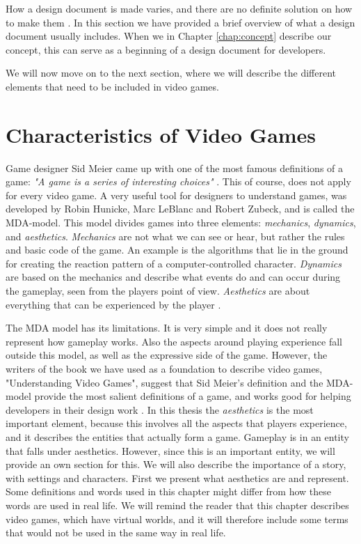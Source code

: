 How a design document is made varies, and there are no definite solution on how to make them \cite{gamedesign}. In this section we have provided a brief overview of what a design document usually includes. When we in Chapter \ref{chap:concept} describe our concept, this can serve as a beginning of a design document for developers.

We will now move on to the next section, where we will describe the different elements that need to be included in video games.

\section{Characteristics of Video Games}
\label{sec:videogametheory}

Game designer Sid Meier came up with one of the most famous definitions of a game: \emph{"A game is a series of interesting choices"} \cite{understandingvg}. This of course, does not apply for every video game. A very useful tool for designers to understand games, was developed by Robin Hunicke, Marc LeBlanc and Robert Zubeck, and is called the MDA-model. This model divides games into three elements: \emph{mechanics}, \emph{dynamics}, and \emph{aesthetics}. \emph{Mechanics} are not what we can see or hear, but rather the rules and basic code of the game. An example is the algorithms that lie in the ground for creating the reaction pattern of a computer-controlled character. \emph{Dynamics} are based on the mechanics and describe what events do and can occur during the gameplay, seen from the players point of view. \emph{Aesthetics} are about everything that can be experienced by the player \cite{understandingvg}. 

The MDA model has its limitations. It is very simple and it does not really represent how gameplay works. Also the aspects around playing experience fall outside this model, as well as the expressive side of the game. However, the writers of the book we have used as a foundation to describe video games, "Understanding Video Games", suggest that Sid Meier's definition and the MDA-model provide the most salient definitions of a game, and works good for helping developers in their design work \cite{understandingvg}. In this thesis the \emph{aesthetics} is the most important element, because this involves all the aspects that players experience, and it describes the entities that actually form a game. Gameplay is in \cite{understandingvg} an entity that falls under aesthetics. However, since this is an important entity, we will provide an own section for this. We will also describe the importance of a story, with settings and characters. First we present what aesthetics are and represent. Some definitions and words used in this chapter might differ from how these words are used in real life. We will remind the reader that this chapter describes video games, which have virtual worlds, and it will therefore include some terms that would not be used in the same way in real life.    



